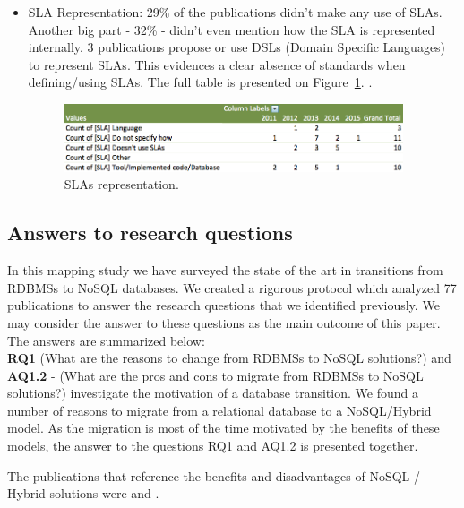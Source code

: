 \documentclass{article}
\begin{document}
\begin{itemize}
\item{SLA Representation: }
29\% of the publications didn't make any use of SLAs. Another big part - 32\% - didn't even mention how the SLA is represented internally. 3 publications propose or use DSLs (Domain Specific Languages) to represent SLAs. This evidences a clear absence of standards when defining/using SLAs. The full table is presented on Figure~\ref{fig:slaRepresentation}. \cite{fullDBJson}.
\begin{figure}[htb!]
\centering
\includegraphics[width=100mm]{graph4.png}
\caption{SLAs representation.\label{fig:slaRepresentation}}
\end{figure}



\end{itemize}


\newpage

\subsection{Answers to research questions}

In this mapping study we have surveyed the state of the art in transitions from RDBMSs to NoSQL databases. We created a rigorous protocol which analyzed 77 publications to answer the research questions that we identified previously. We may consider the answer to these questions as the main outcome of this paper. The answers are summarized below:
\\

\textbf{RQ1} (What are the reasons to change from RDBMSs to NoSQL solutions?)  and \textbf{AQ1.2} - (What are the pros and cons to migrate from RDBMSs to NoSQL solutions?) investigate the motivation of a database transition. We found a number of reasons to migrate from a relational database to a NoSQL/Hybrid model. As the migration is most of the time motivated by the benefits of these models, the answer to the questions RQ1 and AQ1.2 is presented together. 

 The publications that reference the benefits and disadvantages of NoSQL / Hybrid solutions  were \cite{Schram:2012:MND:2384716.2384773} \cite{buazuartransition} and \cite{gomez2014building}.
\end{document}
